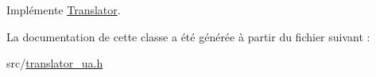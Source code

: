 Implémente \hyperlink{class_translator_a31e719b4e290a359ddbb78132bf3f494}{Translator}.



La documentation de cette classe a été générée à partir du fichier suivant \+:\begin{DoxyCompactItemize}
\item 
src/\hyperlink{translator__ua_8h}{translator\+\_\+ua.\+h}\end{DoxyCompactItemize}
